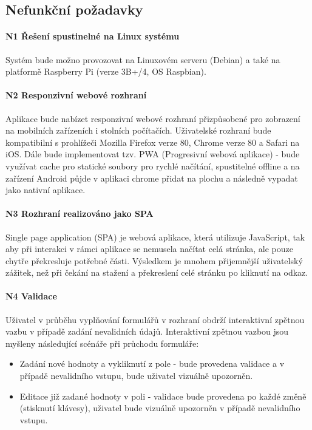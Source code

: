 \subsection{Nefunkční požadavky}

\paragraph{N1 Řešení spustinelné na Linux systému}
Systém bude možno provozovat na Linuxovém serveru (Debian) a také na platformě Raspberry Pi (verze 3B+/4, OS Raspbian).

\paragraph{N2 Responzivní webové rozhraní}
Aplikace bude nabízet responzivní webové rozhraní přizpůsobené pro zobrazení na mobilních zařízeních i stolních počítačích. Uživatelské rozhraní bude kompatibilní s prohlížeči Mozilla Firefox verze 80, Chrome verze 80 a Safari na iOS. Dále bude implementovat tzv. PWA (Progresivní webová aplikace) - bude využívat cache pro statické soubory pro rychlé načítání, spustitelné offline a na zařízení Android půjde v aplikaci chrome přidat na plochu a následně vypadat jako nativní aplikace.

\paragraph{N3 Rozhraní realizováno jako SPA}
Single page application (SPA) je webová aplikace, která utilizuje JavaScript, tak aby při interakci v rámci aplikace se nemusela načítat celá stránka, ale pouze chytře překresluje potřebné části. Výsledkem je mnohem přijemnější uživatelský zážitek, než při čekání na stažení a překreslení celé stránku po kliknutí na odkaz.

\paragraph{N4 Validace}
Uživatel v průběhu vyplňování formulářů v rozhraní obdrží interaktivní zpětnou vazbu v případě zadání nevalidních údajů. Interaktivní zpětnou vazbou jsou myšleny následující scénáře při průchodu formuláře:
\begin{itemize}
    \item Zadání nové hodnoty a vykliknutí z pole - bude provedena validace a v případě nevalidního vstupu, bude uživatel vizuálně  upozorněn.
    \item Editace již zadané hodnoty v poli - validace bude provedena po každé změně (stisknutí klávesy), uživatel bude vizuálně upozorněn v případě nevalidního vstupu.
\end{itemize}

